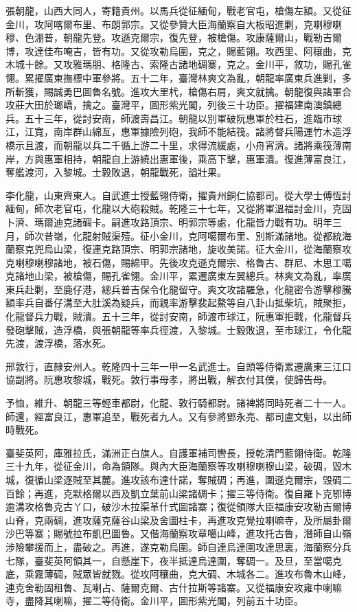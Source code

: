 \begin{pinyinscope}
張朝龍，山西大同人，寄籍貴州。以馬兵從征緬甸，戰老官屯，槍傷左額。又從征金川，攻阿喀爾布里、布朗郭宗。又從參贊大臣海蘭察自大板昭進剿，克喇穆喇穆、色淜普，朝龍先登。攻遜克爾宗，復先登，被槍傷。攻康薩爾山，戰勒吉爾博，攻達佳布唵吉，皆有功。又從攻勒烏圍，克之，賜藍翎。攻西里、阿穰曲，克木城十餘。又攻雅瑪朋、格隆古、索隆古諸地碉寨，克之。金川平，敘功，賜孔雀翎。累擢廣東撫標中軍參將。五十二年，臺灣林爽文為亂，朝龍率廣東兵進剿，多所斬獲，賜誠勇巴圖魯名號。進攻大里杙，槍傷右肩，爽文就擒。朝龍復與諸軍合攻莊大田於瑯嶠，擒之。臺灣平，圖形紫光閣，列後三十功臣。擢福建南澳鎮總兵。五十三年，從討安南，師渡壽昌江。朝龍以別軍破阮惠軍於柱石，進臨市球江，江寬，南岸群山綿亙，惠軍據險列砲，我師不能結筏。諸將督兵陽運竹木造浮橋示且渡，而朝龍以兵二千循上游二十里，求得流緩處，小舟宵濟。諸將乘筏薄南岸，方與惠軍相持，朝龍自上游繞出惠軍後，乘高下擊，惠軍潰。復進薄富良江，奪艦渡河，入黎城。士毅敗退，朝龍戰死，謚壯果。

李化龍，山東齊東人。自武進士授藍翎侍衛，擢貴州銅仁協都司。從大學士傅恆討緬甸，師次老官屯，化龍以大砲殺賊。乾隆三十七年，又從將軍溫福討金川，克固卜濟、瑪爾迪克諸碉卡。嗣進攻路頂宗、明郭宗等處，化龍皆力戰有功。明年三月，師次昔嶺，化龍射賊渠殪。征小金川，克阿噶爾布里、別斯滿諸地。從都統海蘭察克兜烏山梁，復連克路頂宗、明郭宗諸地，旋收美諾。征大金川，從海蘭察攻克喇穆喇穆諸地，被石傷，賜綿甲。先後攻克遜克爾宗、格魯古、群尼、木思工噶克諸地山梁，被槍傷，賜孔雀翎。金川平，累遷廣東左翼總兵。林爽文為亂，率廣東兵赴剿，至鹿仔港，總兵普吉保令化龍留守。爽文攻諸羅急，化龍密令游擊穆騰額率兵自番仔溝至大肚溪為疑兵，而親率游擊裴起鰲等自八卦山抵柴坑，賊聚拒，化龍督兵力戰，賊潰。五十三年，從討安南，師渡市球江，阮惠軍拒戰，化龍督兵發砲擊賊，造浮橋，與張朝龍等率兵徑渡，入黎城。士毅敗退，至市球江，令化龍先渡，渡浮橋，落水死。

邢敦行，直隸安州人。乾隆四十三年一甲一名武進士。自頭等侍衛累遷廣東三江口協副將。阮惠攻黎城，戰死。敦行事母孝，將出戰，解衣付其僕，使歸告母。

予恤，維升、朝龍三等輕車都尉，化龍、敦行騎都尉。諸裨將同時死者二十一人。師還，經富良江，惠軍追至，戰死者九人。又有參將鄧永亮、都司盧文魁，以出師時戰死。

臺斐英阿，庫雅拉氏，滿洲正白旗人。自護軍補司轡長，授乾清門藍翎侍衛。乾隆三十九年，從征金川，命為領隊。與內大臣海蘭察等攻喇穆喇穆山梁，破碉，毀木城，復循山梁逐賊至其麓。進攻該布達什諾，奪賊碉；再進，圍遜克爾宗，毀碉二百餘；再進，克默格爾以西及凱立葉前山梁諸碉卡；擢三等侍衛。復自羅卜克鄂博逾溝攻格魯克古丫口，破沙木拉渠革什式圖諸寨；復從領隊大臣福康安攻勒吉爾博山脊，克兩碉，進攻薩克薩谷山梁及舍圖柱卡，再進攻克覺拉喇嘛寺，及所屬卦爾沙巴等寨；賜號拉布凱巴圖魯。又偕海蘭察攻章噶山峰，進攻托古魯，潛師自山嶺涉險攀援而上，盡破之。再進，遂克勒烏圍。師自達烏達圍攻達思裏，海蘭察分兵七隊，臺斐英阿領其一，自懸崖下，夜半抵達烏達圍，奪碉一。及旦，至當噶克底，乘霧薄碉，賊眾皆就戮。從攻阿穰曲，克大碉、木城各二。進攻布魯木山峰，連克舍勒固租魯、瓦喇占、薩爾克爾、古什拉斯等諸寨。又從福康安攻雍中喇嘛寺，盡降其喇嘛，擢二等侍衛。金川平，圖形紫光閣，列前五十功臣。


\end{pinyinscope}

